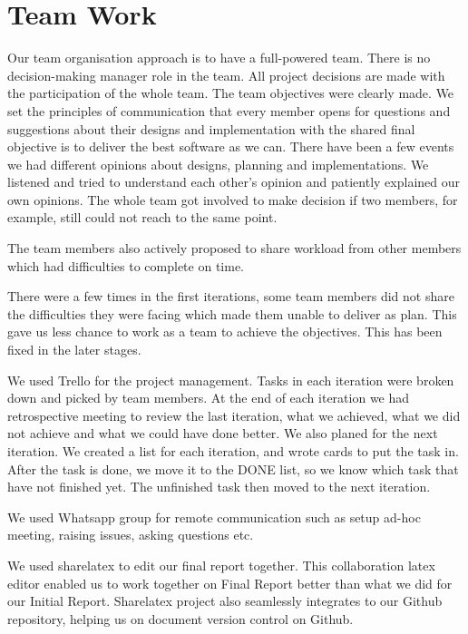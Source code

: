 \documentclass[11pt]{article}
\begin{document}
\pagebreak
\section{Team Work}
Our team organisation approach is to have a full-powered team. There is no decision-making manager role in the team. All project decisions are made with the participation of the whole team. 
The team objectives were clearly made. We set the principles of communication that  every member opens for questions and suggestions about their designs and implementation with the shared final  objective is to deliver the best software as we can. 
There have been a few events we had different opinions about designs, planning and implementations. We listened and tried to understand each other's opinion and patiently explained our own opinions. The whole team got involved to make decision if two members, for example, still could not reach to the same point. 

The team members also actively proposed to share workload from other members which had difficulties to complete on time.

There were a few times in the first iterations, some team members did not share the difficulties they were facing which made them unable to deliver as plan. This gave us less chance to work as a team to achieve the objectives. This  has been fixed in the later stages. 

We used Trello for the project management. Tasks in each iteration were broken down and picked by team members. At the end of each iteration we had retrospective meeting to review the last iteration, what we achieved, what we did not achieve and what we could have done better. We also planed for the next iteration. We created a list for each iteration, and wrote cards to put the task in. After the task is done, we move it to the DONE list, so we know which task that have not finished yet. The unfinished task then moved to the next iteration.

We used Whatsapp group for remote communication such as setup ad-hoc meeting, raising issues, asking questions etc.
 

We used sharelatex to edit our final report together. This collaboration latex editor enabled us to work together on Final Report better than what we did for our Initial Report. Sharelatex project also seamlessly integrates to our Github repository, helping us on document version control on Github. 
\end{document}
